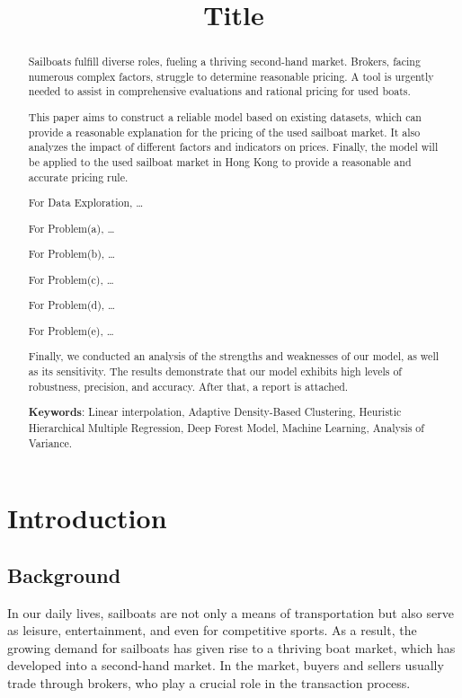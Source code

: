 \documentclass[12pt]{article}  %
\title{Title}  %
\begin{document}
\begin{abstract}
    Sailboats fulfill diverse roles, fueling a thriving second-hand market. 
    Brokers, facing numerous complex factors, struggle to determine reasonable pricing. 
    A tool is urgently needed to assist in comprehensive evaluations and rational pricing for used boats.

    This paper aims to construct a reliable model based on existing datasets, 
    which can provide a reasonable explanation for the pricing of the used sailboat market. 
    It also analyzes the impact of different factors and indicators on prices. 
    Finally, the model will be applied to the used sailboat market in Hong Kong to provide a reasonable and accurate pricing rule.

    For Data Exploration, \dots

    For Problem(a), \dots

    For Problem(b), \dots

    For Problem(c), \dots

    For Problem(d), \dots

    For Problem(e), \dots

    Finally, we conducted an analysis of the strengths and weaknesses of our model, as well as its sensitivity. The results demonstrate that our model exhibits high levels of robustness, precision, and accuracy. After that, a report is attached.




    \vspace{5pt}
    \textbf{Keywords}:  Linear interpolation, Adaptive Density-Based Clustering, Heuristic Hierarchical Multiple Regression, Deep Forest Model,  Machine Learning, Analysis of Variance.
 

\end{abstract}

\maketitle  %
\tableofcontents  %


\section{Introduction}
\subsection{Background}
In our daily lives, sailboats are not only a means of transportation but also serve as leisure, entertainment, and even for competitive sports. As a result, the growing demand for sailboats has given rise to a thriving boat market, which has developed into a second-hand market. In the market, buyers and sellers usually trade through brokers, who play a crucial role in the transaction process.
\end{document}
